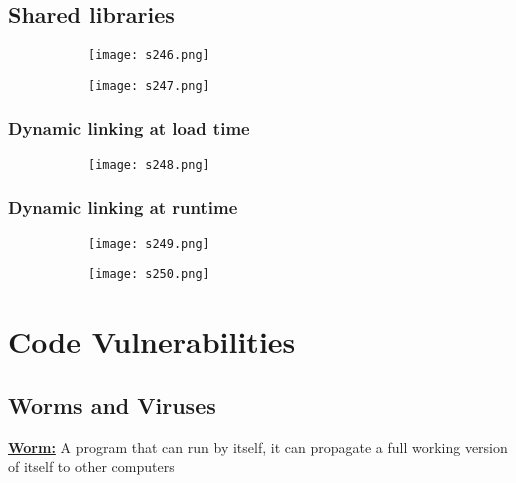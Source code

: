 \documentclass[8pt]{extreport}
\begin{document}
\section{Shared libraries}
\begin{figure}[H]
\centering
\begin{subfigure}[b]{0.4\linewidth}
\texttt{[image: s246.png]}
\end{subfigure}
\begin{subfigure}[b]{0.4\linewidth}
\texttt{[image: s247.png]}
\end{subfigure}
\end{figure}
\subsection{Dynamic linking at load time}
\begin{figure}[H]
\centering
\begin{subfigure}[b]{0.4\linewidth}
\texttt{[image: s248.png]}
\end{subfigure}
\end{figure}

\subsection{Dynamic linking at runtime}
\begin{figure}[H]
\centering
\begin{subfigure}[b]{0.4\linewidth}
\texttt{[image: s249.png]}
\end{subfigure}
\begin{subfigure}[b]{0.4\linewidth}
\texttt{[image: s250.png]}
\end{subfigure}
\end{figure}

\chapter{Code Vulnerabilities}


\section{Worms and Viruses}

\underline{\textbf{Worm:}} A program that can run by itself, it can propagate a full working version of itself to other computers
\end{document}
